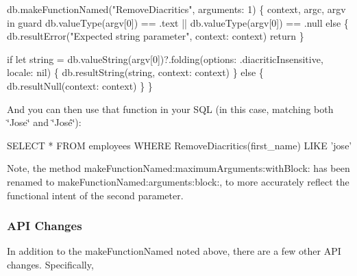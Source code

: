 \begin{DoxyCode}
db.makeFunctionNamed("RemoveDiacritics", arguments: 1) \{ context, argc, argv in
    guard db.valueType(argv[0]) == .text || db.valueType(argv[0]) == .null else \{
        db.resultError("Expected string parameter", context: context)
        return
    \}

    if let string = db.valueString(argv[0])?.folding(options: .diacriticInsensitive, locale: nil) \{
        db.resultString(string, context: context)
    \} else \{
        db.resultNull(context: context)
    \}
\}
\end{DoxyCode}


And you can then use that function in your S\+QL (in this case, matching both \char`\"{}\+Jose\char`\"{} and \char`\"{}\+José\char`\"{})\+:


\begin{DoxyCode}
\textcolor{keyword}{SELECT} * \textcolor{keyword}{FROM} employees \textcolor{keyword}{WHERE} RemoveDiacritics(first\_name) \textcolor{keyword}{LIKE} \textcolor{stringliteral}{'jose'}
\end{DoxyCode}


Note, the method {\ttfamily make\+Function\+Named\+:maximum\+Arguments\+:with\+Block\+:} has been renamed to {\ttfamily make\+Function\+Named\+:arguments\+:block\+:}, to more accurately reflect the functional intent of the second parameter.

\subsubsection*{A\+PI Changes}

In addition to the {\ttfamily make\+Function\+Named} noted above, there are a few other A\+PI changes. Specifically,


